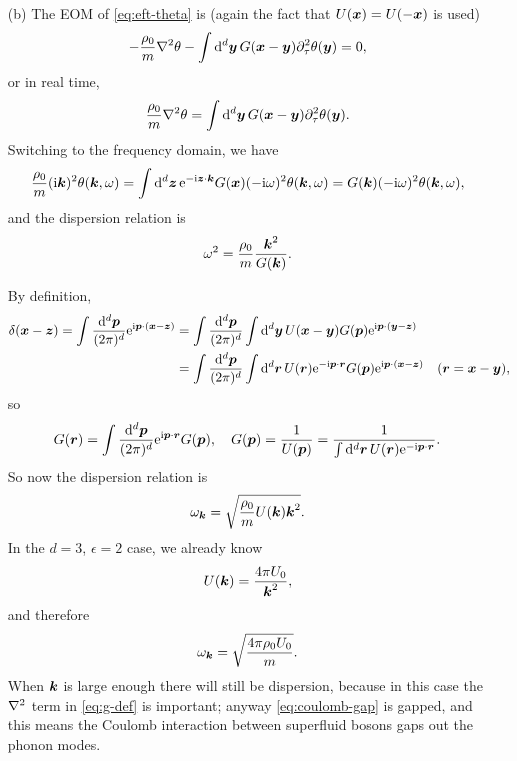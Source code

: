 \documentclass[hyperref, a4paper]{article}
\newcommand*{\ii}{\mathrm{i}}
\newcommand*{\ee}{\mathrm{e}}
\begin{document}
\begin{itemize}
\item[(b)] The EOM of \eqref{eq:eft-theta} is (again the fact that $U(\vb*{x}) = U(- \vb*{x})$ is used)
\[
    - \frac{\rho_0}{m} \laplacian \theta - \int \dd[d]{\vb*{y}} G(\vb*{x} - \vb*{y}) \partial_\tau^2 \theta(\vb*{y}) = 0,
\]
or in real time, 
\begin{equation}
    \frac{\rho_0}{m} \laplacian \theta = \int \dd[d]{\vb*{y}} G(\vb*{x} - \vb*{y}) \partial_\tau^2 \theta(\vb*{y}).
\end{equation}
Switching to the frequency domain, 
we have 
\begin{equation}
    \frac{\rho_0}{m} (\ii \vb*{k})^2 \theta(\vb*{k}, \omega)
    = \int \dd[d]{\vb*{z}} \ee^{- \ii \vb*{z} \cdot \vb*{k}} G(\vb*{x}) (- \ii \omega)^2 \theta(\vb*{k}, \omega)
    = G(\vb*{k}) (- \ii \omega)^2 \theta(\vb*{k}, \omega),
\end{equation}
and the dispersion relation is 
\begin{equation}
    \omega^2 = \frac{\rho_0}{m} \frac{\vb*{k}^2}{G(\vb*{k})}.
\end{equation}

By definition, 
\[
    \begin{aligned}
        \delta(\vb*{x} - \vb*{z}) 
        = \int \frac{\dd[d]{\vb*{p}}}{(2\pi)^d} \ee^{\ii \vb*{p} \cdot (\vb*{x} - \vb*{z})}
        &= \int \frac{\dd[d]{\vb*{p}}}{(2\pi)^d} \int \dd[d]{\vb*{y}} U(\vb*{x} - \vb*{y}) 
        G(\vb*{p}) \ee^{\ii \vb*{p} \cdot (\vb*{y} - \vb*{z})} \\
        &= \int \frac{\dd[d]{\vb*{p}}}{(2\pi)^d} 
        \int \dd[d]{\vb*{r}} U(\vb*{r}) \ee^{- \ii \vb*{p} \cdot \vb*{r}} 
        G(\vb*{p}) \ee^{\ii \vb*{p} \cdot (\vb*{x} - \vb*{z})} \quad (\vb*{r} = \vb*{x} - \vb*{y}) ,
    \end{aligned}
\]
so 
\begin{equation}
    G(\vb*{r}) = \int \frac{\dd[d]{\vb*{p}}}{(2\pi)^d} \ee^{\ii \vb*{p} \cdot \vb*{r}} G(\vb*{p}), \quad 
    G(\vb*{p}) = \frac{1}{U(\vb*{p})} 
    = \frac{1}{\int \dd[d]{\vb*{r}} U(\vb*{r}) \ee^{- \ii \vb*{p} \cdot \vb*{r}}}.
\end{equation}
So now the dispersion relation is 
\begin{equation}
    \omega_{\vb*{k}} = \sqrt{ \frac{\rho_0}{m} U(\vb*{k}) \vb*{k}^2  }.
\end{equation}
In the $d = 3$, $\epsilon = 2$ case, we already know
\begin{equation}
    U(\vb*{k}) = \frac{4\pi U_0}{\vb*{k}^2},
\end{equation}
and therefore 
\begin{equation}
    \omega_{\vb*{k}} = \sqrt{\frac{4 \pi \rho_0 U_0}{m}}.
    \label{eq:coulomb-gap}
\end{equation}
When $\vb*{k}$ is large enough there will still be dispersion,
because in this case the $\laplacian$ term in \eqref{eq:g-def} is important;
anyway \eqref{eq:coulomb-gap} is gapped,
and this means the Coulomb interaction between superfluid bosons gaps out the phonon modes.

\end{itemize}
\end{document}
